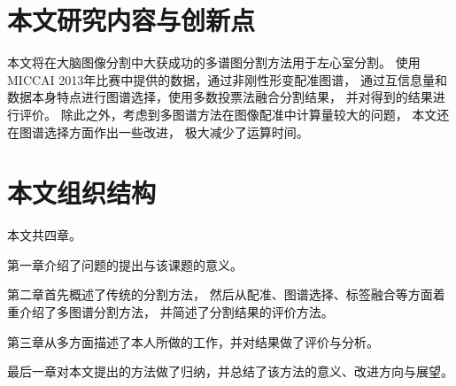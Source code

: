 \section{本文研究内容与创新点}

本文将在大脑图像分割中大获成功的多谱图分割方法用于左心室分割。
使用MICCAI 2013年比赛中提供的数据，通过非刚性形变配准图谱，
通过互信息量和数据本身特点进行图谱选择，使用多数投票法融合分割结果，
并对得到的结果进行评价。
除此之外，考虑到多图谱方法在图像配准中计算量较大的问题，
本文还在图谱选择方面作出一些改进，
极大减少了运算时间。

\section{本文组织结构}
本文共四章。

第一章介绍了问题的提出与该课题的意义。

第二章首先概述了传统的分割方法，
然后从配准、图谱选择、标签融合等方面着重介绍了多图谱分割方法，
并简述了分割结果的评价方法。

第三章从多方面描述了本人所做的工作，并对结果做了评价与分析。

最后一章对本文提出的方法做了归纳，并总结了该方法的意义、改进方向与展望。

